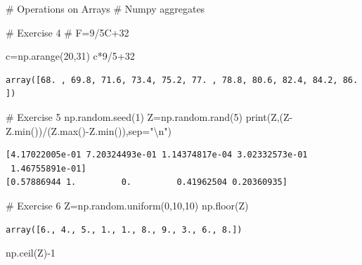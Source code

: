 \documentclass[
  a4paper,
  DIV=11,
  numbers=noendperiod]{scrreprt}
\newenvironment{Shaded}{\begin{snugshade}}{\end{snugshade}}
\newcommand{\BuiltInTok}[1]{\textcolor[rgb]{0.00,0.23,0.31}{#1}}
\newcommand{\CharTok}[1]{\textcolor[rgb]{0.13,0.47,0.30}{#1}}
\newcommand{\CommentTok}[1]{\textcolor[rgb]{0.37,0.37,0.37}{#1}}
\newcommand{\DecValTok}[1]{\textcolor[rgb]{0.68,0.00,0.00}{#1}}
\newcommand{\NormalTok}[1]{\textcolor[rgb]{0.00,0.23,0.31}{#1}}
\newcommand{\OperatorTok}[1]{\textcolor[rgb]{0.37,0.37,0.37}{#1}}
\newcommand{\StringTok}[1]{\textcolor[rgb]{0.13,0.47,0.30}{#1}}
\begin{document}
\begin{Shaded}
\begin{Highlighting}[]
\CommentTok{\# Operations on Arrays}
\CommentTok{\# Numpy aggregates}

\CommentTok{\# Exercise 4}
\CommentTok{\# F=9/5C+32}

\NormalTok{c}\OperatorTok{=}\NormalTok{np.arange(}\DecValTok{20}\NormalTok{,}\DecValTok{31}\NormalTok{)}
\NormalTok{c}\OperatorTok{*}\DecValTok{9}\OperatorTok{/}\DecValTok{5}\OperatorTok{+}\DecValTok{32}
\end{Highlighting}
\end{Shaded}

\begin{verbatim}
array([68. , 69.8, 71.6, 73.4, 75.2, 77. , 78.8, 80.6, 82.4, 84.2, 86. ])
\end{verbatim}

\begin{Shaded}
\begin{Highlighting}[]
\CommentTok{\# Exercise 5}
\NormalTok{np.random.seed(}\DecValTok{1}\NormalTok{)}
\NormalTok{Z}\OperatorTok{=}\NormalTok{np.random.rand(}\DecValTok{5}\NormalTok{)}
\BuiltInTok{print}\NormalTok{(Z,(Z}\OperatorTok{{-}}\NormalTok{Z.}\BuiltInTok{min}\NormalTok{())}\OperatorTok{/}\NormalTok{(Z.}\BuiltInTok{max}\NormalTok{()}\OperatorTok{{-}}\NormalTok{Z.}\BuiltInTok{min}\NormalTok{()),sep}\OperatorTok{=}\StringTok{"}\CharTok{\textbackslash{}n}\StringTok{"}\NormalTok{)}
\end{Highlighting}
\end{Shaded}

\begin{verbatim}
[4.17022005e-01 7.20324493e-01 1.14374817e-04 3.02332573e-01
 1.46755891e-01]
[0.57886944 1.         0.         0.41962504 0.20360935]
\end{verbatim}

\begin{Shaded}
\begin{Highlighting}[]
\CommentTok{\# Exercise 6}
\NormalTok{Z}\OperatorTok{=}\NormalTok{np.random.uniform(}\DecValTok{0}\NormalTok{,}\DecValTok{10}\NormalTok{,}\DecValTok{10}\NormalTok{)}
\NormalTok{np.floor(Z)}
\end{Highlighting}
\end{Shaded}

\begin{verbatim}
array([6., 4., 5., 1., 1., 8., 9., 3., 6., 8.])
\end{verbatim}

\begin{Shaded}
\begin{Highlighting}[]
\NormalTok{np.ceil(Z)}\OperatorTok{{-}}\DecValTok{1}
\end{Highlighting}
\end{Shaded}
\end{document}
